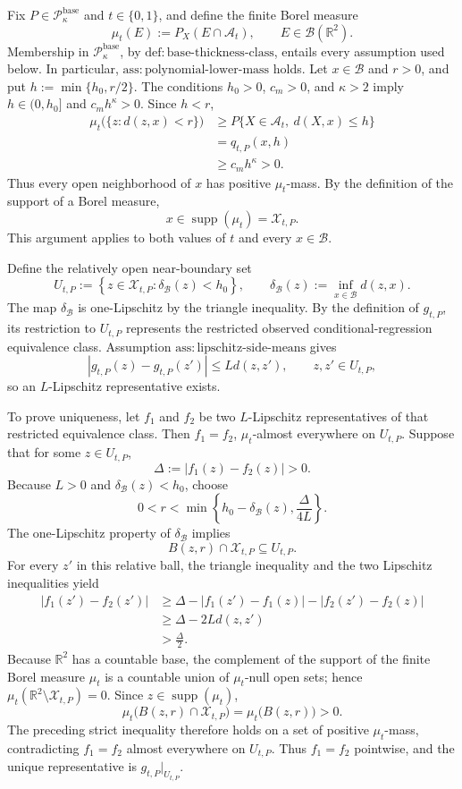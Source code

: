 Fix \(P\in\mathcal P_{\kappa}^{\mathrm{base}}\) and \(t\in\{0,1\}\), and define the finite Borel measure
\[
\mu_t(E):=P_X(E\cap\mathcal A_t),\qquad E\in\mathcal B(\mathbb R^2).
\]
Membership in \(\mathcal P_{\kappa}^{\mathrm{base}}\), by \(\mathrm{def:base\text{-}thickness\text{-}class}\), entails every assumption used below. In particular, \(\mathrm{ass:polynomial\text{-}lower\text{-}mass}\) holds. Let \(x\in\mathcal B\) and \(r>0\), and put \(h:=\min\{h_0,r/2\}\). The conditions \(h_0>0\), \(c_m>0\), and \(\kappa>2\) imply \(h\in(0,h_0]\) and \(c_mh^{\kappa}>0\). Since \(h<r\),
\[
\begin{aligned}
\mu_t\bigl(\{z:d(z,x)<r\}\bigr)
&\ge P\{X\in\mathcal A_t,\ d(X,x)\le h\}\\
&=q_{t,P}(x,h)\\
&\ge c_mh^{\kappa}>0.
\end{aligned}
\]
Thus every open neighborhood of \(x\) has positive \(\mu_t\)-mass. By the definition of the support of a Borel measure,
\[
x\in\operatorname{supp}(\mu_t)=\mathcal X_{t,P}.
\]
This argument applies to both values of \(t\) and every \(x\in\mathcal B\).

Define the relatively open near-boundary set
\[
U_{t,P}:=\left\{z\in\mathcal X_{t,P}:\delta_{\mathcal B}(z)<h_0\right\},
\qquad
\delta_{\mathcal B}(z):=\inf_{x\in\mathcal B}d(z,x).
\]
The map \(\delta_{\mathcal B}\) is one-Lipschitz by the triangle inequality. By the definition of \(g_{t,P}\), its restriction to \(U_{t,P}\) represents the restricted observed conditional-regression equivalence class. Assumption \(\mathrm{ass:lipschitz\text{-}side\text{-}means}\) gives
\[
|g_{t,P}(z)-g_{t,P}(z')|\le Ld(z,z'),
\qquad z,z'\in U_{t,P},
\]
so an \(L\)-Lipschitz representative exists.

To prove uniqueness, let \(f_1\) and \(f_2\) be two \(L\)-Lipschitz representatives of that restricted equivalence class. Then \(f_1=f_2\), \(\mu_t\)-almost everywhere on \(U_{t,P}\). Suppose that for some \(z\in U_{t,P}\),
\[
\Delta:=|f_1(z)-f_2(z)|>0.
\]
Because \(L>0\) and \(\delta_{\mathcal B}(z)<h_0\), choose
\[
0<r<\min\left\{h_0-\delta_{\mathcal B}(z),\frac{\Delta}{4L}\right\}.
\]
The one-Lipschitz property of \(\delta_{\mathcal B}\) implies
\[
B(z,r)\cap\mathcal X_{t,P}\subseteq U_{t,P}.
\]
For every \(z'\) in this relative ball, the triangle inequality and the two Lipschitz inequalities yield
\[
\begin{aligned}
|f_1(z')-f_2(z')|
&\ge \Delta-|f_1(z')-f_1(z)|-|f_2(z')-f_2(z)|\\
&\ge \Delta-2L d(z,z')\\
&>\frac{\Delta}{2}.
\end{aligned}
\]
Because \(\mathbb R^2\) has a countable base, the complement of the support of the finite Borel measure \(\mu_t\) is a countable union of \(\mu_t\)-null open sets; hence \(\mu_t(\mathbb R^2\setminus\mathcal X_{t,P})=0\). Since \(z\in\operatorname{supp}(\mu_t)\),
\[
\mu_t\bigl(B(z,r)\cap\mathcal X_{t,P}\bigr)
=\mu_t\bigl(B(z,r)\bigr)>0.
\]
The preceding strict inequality therefore holds on a set of positive \(\mu_t\)-mass, contradicting \(f_1=f_2\) almost everywhere on \(U_{t,P}\). Thus \(f_1=f_2\) pointwise, and the unique representative is \(g_{t,P}|_{U_{t,P}}\).

